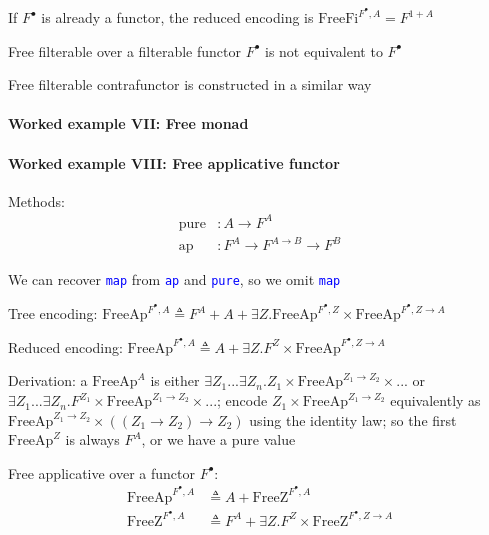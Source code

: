 If $F^{\bullet}$ is already a functor, the reduced encoding is $\text{FreeFi}^{F^{\bullet},A}=F^{1+A}$

Free filterable over a filterable functor $F^{\bullet}$ is not equivalent
to $F^{\bullet}$

Free filterable contrafunctor is constructed in a similar way


\paragraph{Worked example VII: Free monad}


\paragraph{Worked example VIII: Free applicative functor}

Methods:
\begin{align*}
\text{pure} & :A\rightarrow F^{A}\\
\text{ap} & :F^{A}\rightarrow F^{A\rightarrow B}\rightarrow F^{B}
\end{align*}

We can recover \texttt{\textcolor{blue}{\footnotesize{}map}} from
\texttt{\textcolor{blue}{\footnotesize{}ap}} and \texttt{\textcolor{blue}{\footnotesize{}pure}},
so we omit \texttt{\textcolor{blue}{\footnotesize{}map}} 

Tree encoding: {\footnotesize{}$\text{FreeAp}^{F^{\bullet},A}\triangleq F^{A}+A+\exists Z.\text{FreeAp}^{F^{\bullet},Z}\times\text{FreeAp}^{F^{\bullet},Z\rightarrow A}$}{\footnotesize\par}

Reduced encoding:{\footnotesize{} $\text{FreeAp}^{F^{\bullet},A}\triangleq A+\exists Z.F^{Z}\times\text{FreeAp}^{F^{\bullet},Z\rightarrow A}$}{\footnotesize\par}

Derivation: a $\text{FreeAp}^{A}$ is either $\exists Z_{1}...\exists Z_{n}.Z_{1}\times\text{FreeAp}^{Z_{1}\rightarrow Z_{2}}\times...$
or $\exists Z_{1}...\exists Z_{n}.F^{Z_{1}}\times\text{FreeAp}^{Z_{1}\rightarrow Z_{2}}\times...$;
encode $Z_{1}\times\text{FreeAp}^{Z_{1}\rightarrow Z_{2}}$ equivalently
as $\text{FreeAp}^{Z_{1}\rightarrow Z_{2}}\times\left(\left(Z_{1}\rightarrow Z_{2}\right)\rightarrow Z_{2}\right)$
using the identity law; so the first $\text{FreeAp}^{Z}$ is always
$F^{A}$, or we have a pure value 

Free applicative over a functor $F^{\bullet}$: 
\begin{align*}
\text{FreeAp}^{F^{\bullet},A} & \triangleq A+\text{FreeZ}^{F^{\bullet},A}\\
\text{FreeZ}^{F^{\bullet},A} & \triangleq F^{A}+\exists Z.F^{Z}\times\text{FreeZ}^{F^{\bullet},Z\rightarrow A}
\end{align*}

